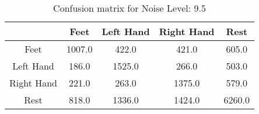 \begin{table}[!htbp]
    \centering
    \begin{tabular}{|c||c|c|c|c|}
        \hline
		 & Feet & Left Hand & Right Hand & Rest \\
        \hline
        \hline
        Feet & 1007.0 & 422.0 & 421.0 & 605.0 \\
        \hline
        Left Hand & 186.0 & 1525.0 & 266.0 & 503.0 \\
        \hline
        Right Hand & 221.0 & 263.0 & 1375.0 & 579.0 \\
        \hline
        Rest & 818.0 & 1336.0 & 1424.0 & 6260.0 \\
        \hline
    \end{tabular}
    \caption{Confusion matrix for Noise Level: 9.5}
\end{table}